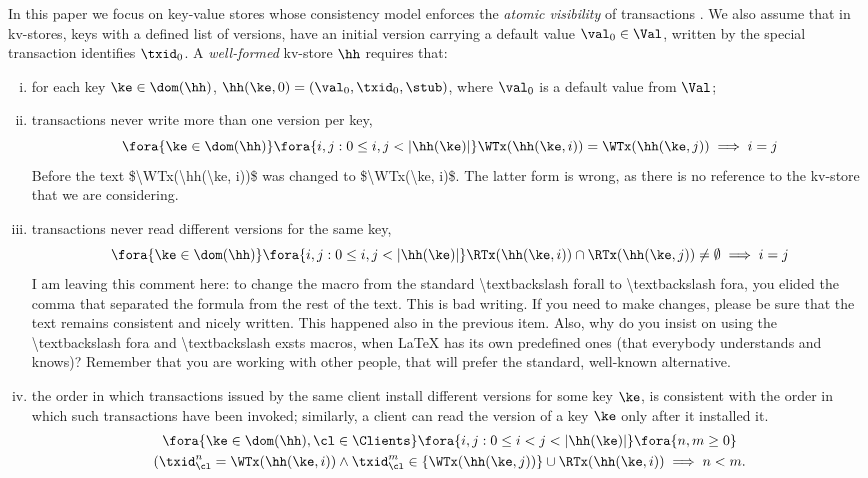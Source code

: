 In this paper we focus on key-value stores whose consistency model enforces the  
\emph{atomic visibility} of transactions \cite{framework-concur}. 
We also assume that in kv-stores, keys with a defined list of versions, have an initial version carrying  a default value $\val_0 \in \Val$, 
written by the special transaction identifies $\txid_0$.
A \emph{well-formed} kv-store $\hh$ requires that:
\begin{enumerate}[(i)]
\item\label{kv:wf.init} for each key $\ke \in \dom(\hh)$, $\hh(\ke, 0) = (\val_0, \txid_0, \stub)$, where $\val_0$ is a default value from $\Val$;
\item\label{kv:wf.onewrite} transactions never write more than one version per key,  
\[
\fora{\ke \in \dom(\hh)} \fora{ i,j : 0 \leq i, j < \lvert \hh(\ke) \rvert}
\WTx(\hh(\ke, i)) = \WTx(\hh(\ke, j)) \implies i = j \]
\ac{Before the text $\WTx(\hh(\ke, i))$ was changed to $\WTx(\ke, i)$. The latter form is wrong, 
as there is no reference to the kv-store that we are considering.}
\item\label{kv:wf.oneread} transactions never read different versions for the same key, 
\[
\fora{\ke \in \dom(\hh)} \fora{ i,j : 0 \leq i, j < \lvert \hh(\ke) \rvert} 
\RTx(\hh(\ke, i)) \cap \RTx(\hh(\ke, j)) \neq \emptyset \implies i = j
\]
\ac{I am leaving this comment here: to change the macro from the standard \textbackslash forall 
to \textbackslash fora, you elided the comma that separated the formula from the rest of the text. 
This is bad writing. If you need to make changes, please be sure that the text remains consistent 
and nicely written. This happened also in the previous item.}
\ac{Also, why do you insist on using the \textbackslash fora and \textbackslash exsts macros, when LaTeX has 
its own predefined ones (that everybody understands and knows)? Remember that you are working with other people, 
that will prefer the standard, well-known alternative.}
\item\label{kv:wf.so} the order 
in which transactions issued by the same client install different versions for some key $\ke$, is consistent with the order in which 
such transactions have been invoked; similarly, a client can read the version of a key $\ke$ only after it installed it. 
\begin{multline*}
\fora{ \ke \in \dom(\hh), \cl \in \Clients} \fora{ i,j: 0 \leq i < j < \lvert \hh(\ke) \rvert}
\fora{ n, m \geq 0}\\ (\txid_{\cl}^{n} = \WTx(\hh(\ke,i)) \wedge \txid_{\cl}^{m} \in \{\WTx(\hh(\ke,j))\} \cup \RTx(\hh(\ke, i)) \implies n < m.
\end{multline*}
\end{enumerate}
